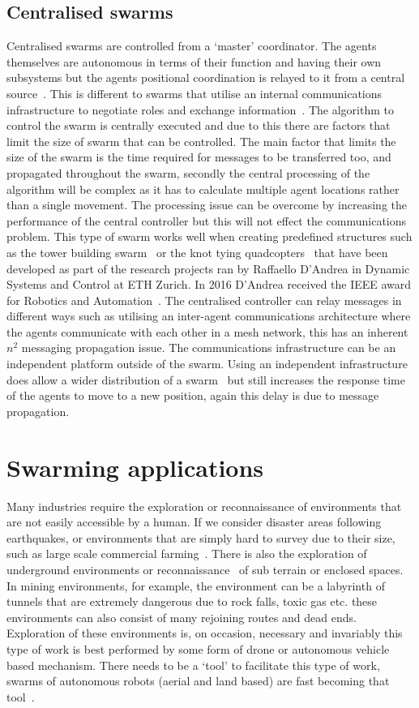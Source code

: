 \subsection{Centralised swarms}
Centralised swarms are controlled from a `master' coordinator. The agents themselves are autonomous in terms of their function and having their own subsystems but the agents positional coordination is relayed to it from a central source~\cite{SB:93, MYP:09}. This is different to swarms that utilise an internal communications infrastructure to negotiate roles and exchange information~\cite{OFM:07}. The algorithm to control the swarm is centrally executed and due to this there are factors that limit the size of swarm that can be controlled. 
The main factor that limits the size of the swarm is the time required for messages to be transferred too, and propagated throughout the swarm, secondly the central processing of the algorithm will be complex as it has to calculate multiple agent locations rather than a single movement. The processing issue can be overcome by increasing the performance of the central controller but this will not effect the communications problem. 
This type of swarm works well when creating predefined structures such as the tower building swarm~\cite{EG:11} or the knot tying quadcopters~\cite{AZMD:15} that have been developed as part of the research projects ran by Raffaello D'Andrea in Dynamic Systems and Control at ETH Zurich. In 2016 D'Andrea received the IEEE award for Robotics and Automation~\cite{I:15}. 
The centralised controller can relay messages in different ways such as utilising an inter-agent communications architecture where the agents communicate with each other in a mesh network, this has an inherent $n^2$ messaging propagation issue. The communications infrastructure can be an independent platform outside of the swarm. Using an independent infrastructure does allow a wider distribution of a swarm~\cite{NVC:15} but still increases the response time of the agents to move to a new position, again this delay is due to message propagation.  

\section{Swarming applications}\label{sec:SwarmApplications} 
Many industries require the exploration or reconnaissance of environments that are not easily accessible by a human. If we consider disaster areas following earthquakes, or environments that are simply hard to survey due to their size, such as large scale commercial farming~\cite{BSB:15, HGCTREA:15}. There is also the exploration of underground environments or reconnaissance~\cite{IBE:08} of sub terrain or enclosed spaces. In mining environments, for example, the environment can be a labyrinth of tunnels that are extremely dangerous due to rock falls, toxic gas etc. these environments can also consist of many rejoining routes and dead ends. Exploration of these environments is, on occasion, necessary and invariably this type of work is best performed by some form of drone or autonomous vehicle based mechanism. There needs to be a `tool' to facilitate this type of work, swarms of autonomous robots (aerial and land based) are fast becoming that tool~\cite{SOM:12, LG:14}. 

